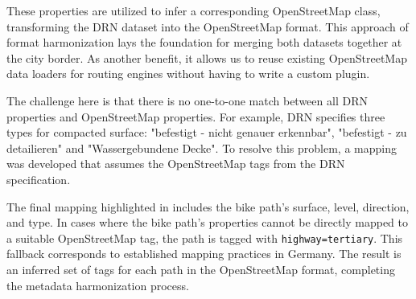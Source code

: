 These properties are utilized to infer a corresponding OpenStreetMap class, transforming the DRN dataset into the OpenStreetMap format. This approach of format harmonization lays the foundation for merging both datasets together at the city border. As another benefit, it allows us to reuse existing OpenStreetMap data loaders for routing engines without having to write a custom plugin.

The challenge here is that there is no one-to-one match between all DRN properties and OpenStreetMap properties. For example, DRN specifies three types for compacted surface: "befestigt - nicht genauer erkennbar", "befestigt - zu detailieren" and "Wassergebundene Decke". To resolve this problem, a mapping was developed that assumes the OpenStreetMap tags from the DRN specification. 

The final mapping highlighted in  includes the bike path's surface, level, direction, and type. In cases where the bike path's properties cannot be directly mapped to a suitable OpenStreetMap tag, the path is tagged with \texttt{highway=tertiary}. This fallback corresponds to established mapping practices in Germany. The result is an inferred set of tags for each path in the OpenStreetMap format, completing the metadata harmonization process.

